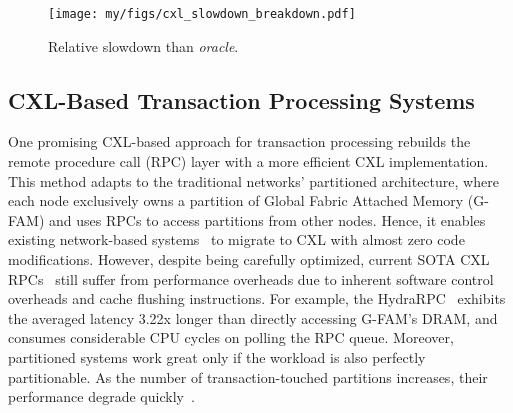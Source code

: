 

\begin{figure}[t]
  \texttt{[image: my/figs/cxl\_slowdown\_breakdown.pdf]}
  \caption{
  Relative slowdown than \textit{oracle}.}
  \label{fig:cxl_slowdown_breakdown}
\end{figure}


\subsection{CXL-Based Transaction Processing Systems}

One promising CXL-based approach for transaction processing rebuilds the remote procedure call (RPC) layer with a more efficient CXL implementation. This method adapts to the traditional networks' partitioned architecture, where each node exclusively owns a partition of Global Fabric Attached Memory (G-FAM) and uses RPCs to access partitions from other nodes. Hence, it enables existing network-based systems~\cite{hstore_damon16, citus_sigmod21, memsql_vldb16, voltdb, calvin_sigmod12} to migrate to CXL with almost zero code modifications. 
However, despite being carefully optimized, current SOTA CXL RPCs~\cite{hydrarpc_atc24, partial_sosp23} still suffer from performance overheads due to inherent software control overheads and cache flushing instructions. For example, the HydraRPC~\cite{hydrarpc_atc24} exhibits the averaged latency 3.22x longer than directly accessing G-FAM's DRAM, and consumes considerable CPU cycles on polling the RPC queue. Moreover, partitioned systems work great only if the workload is also perfectly partitionable. As the number of transaction-touched partitions increases, their performance degrade quickly~\cite{hekaton_sigmod13, silo_sosp13}. 
 
